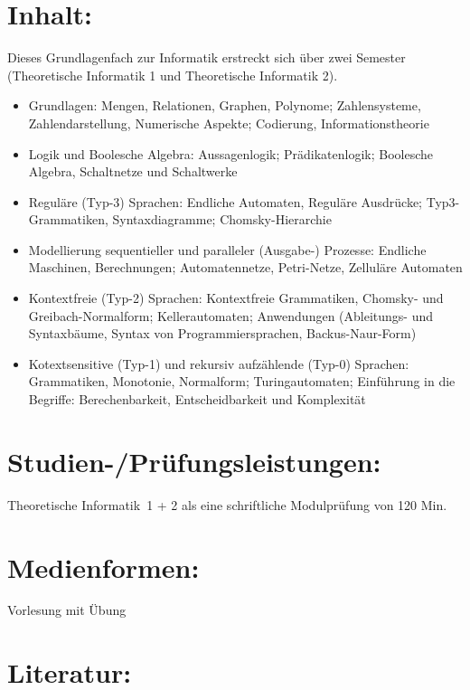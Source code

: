 \section*{Inhalt:}\label{inhalt-23}

Dieses Grundlagenfach zur Informatik erstreckt sich über zwei Semester
(Theoretische Informatik 1 und Theoretische Informatik 2).

\begin{itemize}
\tightlist
\item
  Grundlagen: Mengen, Relationen, Graphen, Polynome; Zahlensysteme,
  Zahlendarstellung, Numerische Aspekte; Codierung, Informationstheorie
\item
  Logik und Boolesche Algebra: Aussagenlogik; Prädikatenlogik; Boolesche
  Algebra, Schaltnetze und Schaltwerke
\item
  Reguläre (Typ-3) Sprachen: Endliche Automaten, Reguläre Ausdrücke;
  Typ3-Grammatiken, Syntaxdiagramme; Chomsky-Hierarchie
\item
  Modellierung sequentieller und paralleler (Ausgabe-) Prozesse:
  Endliche Maschinen, Berechnungen; Automatennetze, Petri-Netze,
  Zelluläre Automaten
\item
  Kontextfreie (Typ-2) Sprachen: Kontextfreie Grammatiken, Chomsky- und
  Greibach-Normalform; Kellerautomaten; Anwendungen (Ableitungs- und
  Syntaxbäume, Syntax von Programmiersprachen, Backus-Naur-Form)
\item
  Kotextsensitive (Typ-1) und rekursiv aufzählende (Typ-0) Sprachen:
  Grammatiken, Monotonie, Normalform; Turingautomaten; Einführung in die
  Begriffe: Berechenbarkeit, Entscheidbarkeit und Komplexität
\end{itemize}

\section*{Studien-/Prüfungsleistungen:}\label{studien-pruxfcfungsleistungen-21}

Theoretische Informatik~1 + 2 als eine schriftliche Modulprüfung von 120
Min.

\section*{Medienformen:}\label{medienformen-14}

Vorlesung mit Übung

\section*{Literatur:}\label{literatur-19}

